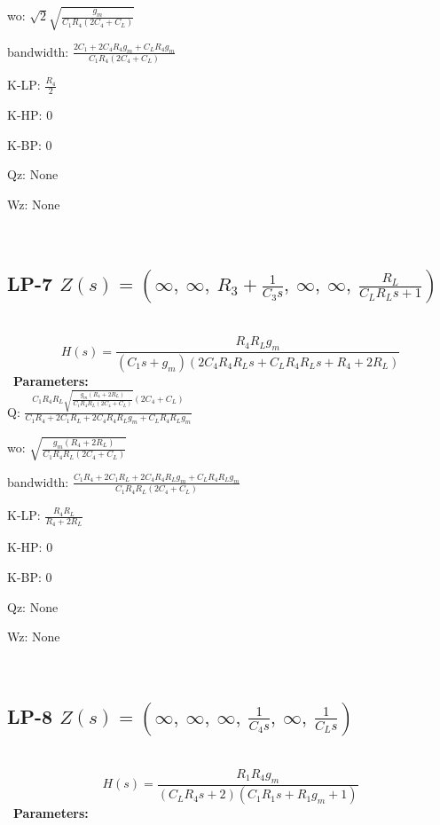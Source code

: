 \documentclass{article}
\begin{document}
wo: $\sqrt{2} \sqrt{\frac{g_{m}}{C_{1} R_{4} \left(2 C_{4} + C_{L}\right)}}$\ 

bandwidth: $\frac{2 C_{1} + 2 C_{4} R_{4} g_{m} + C_{L} R_{4} g_{m}}{C_{1} R_{4} \left(2 C_{4} + C_{L}\right)}$\ 

K-LP: $\frac{R_{4}}{2}$\ 

K-HP: $0$\ 

K-BP: $0$\ 

Qz: $\text{None}$\ 

Wz: $\text{None}$\ 

\ 

\subsection{LP-7 $Z(s) = \left( \infty, \  \infty, \  R_{3} + \frac{1}{C_{3} s}, \  \infty, \  \infty, \  \frac{R_{L}}{C_{L} R_{L} s + 1}\right)$ } \ 
\textbf{\[H(s) = \frac{R_{4} R_{L} g_{m}}{\left(C_{1} s + g_{m}\right) \left(2 C_{4} R_{4} R_{L} s + C_{L} R_{4} R_{L} s + R_{4} + 2 R_{L}\right)}\] } \ 
\textbf{Parameters:}\\ 

Q: $\frac{C_{1} R_{4} R_{L} \sqrt{\frac{g_{m} \left(R_{4} + 2 R_{L}\right)}{C_{1} R_{4} R_{L} \left(2 C_{4} + C_{L}\right)}} \left(2 C_{4} + C_{L}\right)}{C_{1} R_{4} + 2 C_{1} R_{L} + 2 C_{4} R_{4} R_{L} g_{m} + C_{L} R_{4} R_{L} g_{m}}$\ 

wo: $\sqrt{\frac{g_{m} \left(R_{4} + 2 R_{L}\right)}{C_{1} R_{4} R_{L} \left(2 C_{4} + C_{L}\right)}}$\ 

bandwidth: $\frac{C_{1} R_{4} + 2 C_{1} R_{L} + 2 C_{4} R_{4} R_{L} g_{m} + C_{L} R_{4} R_{L} g_{m}}{C_{1} R_{4} R_{L} \left(2 C_{4} + C_{L}\right)}$\ 

K-LP: $\frac{R_{4} R_{L}}{R_{4} + 2 R_{L}}$\ 

K-HP: $0$\ 

K-BP: $0$\ 

Qz: $\text{None}$\ 

Wz: $\text{None}$\ 

\ 

\subsection{LP-8 $Z(s) = \left( \infty, \  \infty, \  \infty, \  \frac{1}{C_{4} s}, \  \infty, \  \frac{1}{C_{L} s}\right)$ } \ 
\textbf{\[H(s) = \frac{R_{1} R_{4} g_{m}}{\left(C_{L} R_{4} s + 2\right) \left(C_{1} R_{1} s + R_{1} g_{m} + 1\right)}\] } \ 
\textbf{Parameters:}\\ 
\end{document}
